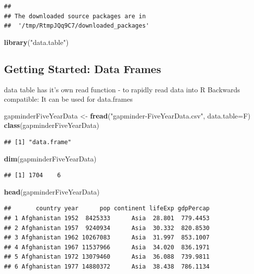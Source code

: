 \documentclass[]{article}
\newenvironment{Shaded}{\begin{snugshade}}{\end{snugshade}}
\newcommand{\KeywordTok}[1]{\textcolor[rgb]{0.13,0.29,0.53}{\textbf{{#1}}}}
\newcommand{\DataTypeTok}[1]{\textcolor[rgb]{0.13,0.29,0.53}{{#1}}}
\newcommand{\StringTok}[1]{\textcolor[rgb]{0.31,0.60,0.02}{{#1}}}
\newcommand{\NormalTok}[1]{{#1}}
\begin{document}
\begin{verbatim}
## 
## The downloaded source packages are in
##  '/tmp/RtmpJQq9C7/downloaded_packages'
\end{verbatim}

\begin{Shaded}
\begin{Highlighting}[]
\KeywordTok{library}\NormalTok{(}\StringTok{"data.table"}\NormalTok{)}
\end{Highlighting}
\end{Shaded}

\subsection{Getting Started: Data
Frames}\label{getting-started-data-frames}

data table has it's own read function - to rapidly read data into R
Backwards compatible: It can be used for data.frames

\begin{Shaded}
\begin{Highlighting}[]
\NormalTok{gapminderFiveYearData <-}\StringTok{ }\KeywordTok{fread}\NormalTok{(}\StringTok{"gapminder-FiveYearData.csv"}\NormalTok{, }\DataTypeTok{data.table=}\NormalTok{F)}
\KeywordTok{class}\NormalTok{(gapminderFiveYearData)}
\end{Highlighting}
\end{Shaded}

\begin{verbatim}
## [1] "data.frame"
\end{verbatim}

\begin{Shaded}
\begin{Highlighting}[]
\KeywordTok{dim}\NormalTok{(gapminderFiveYearData)}
\end{Highlighting}
\end{Shaded}

\begin{verbatim}
## [1] 1704    6
\end{verbatim}

\begin{Shaded}
\begin{Highlighting}[]
\KeywordTok{head}\NormalTok{(gapminderFiveYearData)}
\end{Highlighting}
\end{Shaded}

\begin{verbatim}
##       country year      pop continent lifeExp gdpPercap
## 1 Afghanistan 1952  8425333      Asia  28.801  779.4453
## 2 Afghanistan 1957  9240934      Asia  30.332  820.8530
## 3 Afghanistan 1962 10267083      Asia  31.997  853.1007
## 4 Afghanistan 1967 11537966      Asia  34.020  836.1971
## 5 Afghanistan 1972 13079460      Asia  36.088  739.9811
## 6 Afghanistan 1977 14880372      Asia  38.438  786.1134
\end{verbatim}
\end{document}

